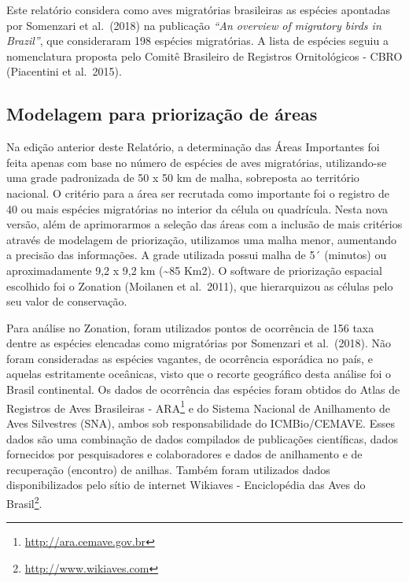 \documentclass[
  oneside]{scrbook}
\DeclareRobustCommand{\href}[2]{#2\footnote{\url{#1}}}
\begin{document}
Este relatório considera como aves migratórias brasileiras as espécies apontadas por Somenzari et al.~(2018) na publicação \emph{``An overview of migratory birds in Brazil''}, que consideraram 198 espécies migratórias. A lista de espécies seguiu a nomenclatura proposta pelo Comitê Brasileiro de Registros Ornitológicos - CBRO (Piacentini et al.~2015).

\hypertarget{modelagem}{%
\subsection{Modelagem para priorização de áreas}\label{modelagem}}

Na edição anterior deste Relatório, a determinação das Áreas Importantes foi feita apenas com base no número de espécies de aves migratórias, utilizando-se uma grade padronizada de 50 x 50 km de malha, sobreposta ao território nacional. O critério para a área ser recrutada como importante foi o registro de 40 ou mais espécies migratórias no interior da célula ou quadrícula. Nesta nova versão, além de aprimorarmos a seleção das áreas com a inclusão de mais critérios através de modelagem de priorização, utilizamos uma malha menor, aumentando a precisão das informações. A grade utilizada possui malha de 5´ (minutos) ou aproximadamente 9,2 x 9,2 km (\textasciitilde85 Km2). O software de priorização espacial escolhido foi o Zonation (Moilanen et al.~2011), que hierarquizou as células pelo seu valor de conservação.

Para análise no Zonation, foram utilizados pontos de ocorrência de 156 taxa dentre as espécies elencadas como migratórias por Somenzari et al.~(2018). Não foram consideradas as espécies vagantes, de ocorrência esporádica no país, e aquelas estritamente oceânicas, visto que o recorte geográfico desta análise foi o Brasil continental. Os dados de ocorrência das espécies foram obtidos do \href{http://ara.cemave.gov.br}{Atlas de Registros de Aves Brasileiras - ARA} e do Sistema Nacional de Anilhamento de Aves Silvestres (SNA), ambos sob responsabilidade do ICMBio/CEMAVE. Esses dados são uma combinação de dados compilados de publicações científicas, dados fornecidos por pesquisadores e colaboradores e dados de anilhamento e de recuperação (encontro) de anilhas. Também foram utilizados dados disponibilizados pelo sítio de internet \href{http://www.wikiaves.com}{Wikiaves - Enciclopédia das Aves do Brasil}.
\end{document}
